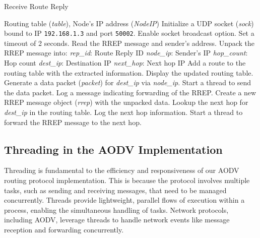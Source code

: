 \documentclass[]{nsm-thesis}
\begin{document}
\begin{algorithm}
\caption{Receive Route Reply }
\begin{algorithmic}[1]
\REQUIRE Routing table (\textit{table}), Node's IP address (\textit{NodeIP})
\STATE Initialize a UDP socket (\textit{sock}) bound to IP \texttt{192.168.1.3} and port \texttt{50002}.
\STATE Enable socket broadcast option.
    \STATE Set a timeout of 2 seconds.
        \STATE Read the RREP message and sender's address.
        \STATE Unpack the RREP message into:
        \STATE \hspace{1em} \textit{rep\_id}: Route Reply ID
        \STATE \hspace{1em} \textit{node\_ip}: Sender's IP
        \STATE \hspace{1em} \textit{hop\_count}: Hop count
        \STATE \hspace{1em} \textit{dest\_ip}: Destination IP
        \STATE \hspace{1em} \textit{next\_hop}: Next hop IP
        \STATE Add a route to the routing table with the extracted information.
        \STATE Display the updated routing table.
            \STATE Generate a data packet (\textit{packet}) for \textit{dest\_ip} via \textit{node\_ip}.
            \STATE Start a thread to send the data packet.
        \ELSE
            \STATE Log a message indicating forwarding of the RREP.
            \STATE Create a new RREP message object (\textit{rrep}) with the unpacked data.
            \STATE Lookup the next hop for \textit{dest\_ip} in the routing table.
            \STATE Log the next hop information.
            \STATE Start a thread to forward the RREP message to the next hop.
        \ENDIF
    \ENDIF
\ENDWHILE
\end{algorithmic}
\end{algorithm}

\clearpage

\subsection{Threading in the AODV Implementation}
Threading is fundamental to the efficiency and responsiveness of our AODV  routing protocol implementation. This is because the protocol involves multiple tasks, such as sending and receiving messages, that need to be managed concurrently. Threads provide lightweight, parallel flows of execution within a process, enabling the simultaneous handling of tasks. Network protocols, including AODV, leverage threads to handle network events like message reception and forwarding concurrently.
\end{document}
